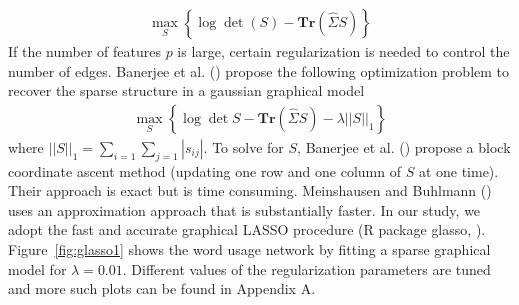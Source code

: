 \documentclass[11pt]{article}
\newcommand{\note}[1]{{\em \color{red} #1}}
\newcommand{\1}[1]{{\mathbf 1}\left\{#1\right\}}        %
\def\lp{\left(}
\def\rp{\right)}
\begin{document}
\begin{align*}
\max_S \left\{  \log \det \lp S\rp - \textbf{Tr}( \hat{\Sigma}S)  \right\}
\end{align*}
If the number of features $p$ is large, certain regularization is needed to control the number of edges. Banerjee et al. (\cite{banerjee2008model}) propose the following optimization problem to recover the sparse structure in a gaussian graphical model
\begin{align*}
\max_S \left\{ \log \det S - \textbf{Tr} \lp \hat{\Sigma}S \rp - \lambda ||S||_1 \right\}
\end{align*}
where $||S||_1 = \sum_{i=1}\sum_{j=1} |s_{ij}|$. To solve for $S$,  Banerjee et al. (\cite{banerjee2008model}) propose a block coordinate ascent method (updating one row and one column of $S$ at one time). Their approach is exact but is time consuming. Meinshausen and Buhlmann (\cite{meinshausen2006high}) uses an approximation approach that is substantially faster. In our study, we adopt the fast and accurate graphical LASSO procedure ({\sffamily R} package {\sffamily glasso}, \cite{Rglasso}). Figure~\ref{fig:glasso1} shows the word usage network by fitting a sparse graphical model for $\lambda=0.01$. Different values of the regularization parameters are tuned and more such plots can be found in Appendix A. 


\end{document}
